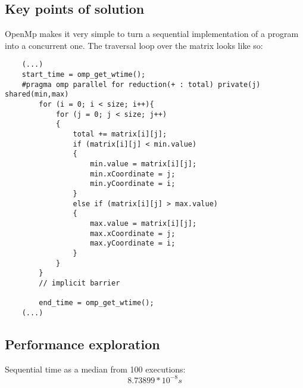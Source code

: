 \documentclass[a4paper,11pt]{article}
\begin{document}
\subsection*{Key points of solution}
OpenMp makes it very simple to turn a sequential implementation of a program into a concurrent one. The traversal loop over the matrix looks like so:

\begin{verbatim}
    (...)
    start_time = omp_get_wtime();
    #pragma omp parallel for reduction(+ : total) private(j) shared(min,max)
        for (i = 0; i < size; i++){
            for (j = 0; j < size; j++)
            {
                total += matrix[i][j];
                if (matrix[i][j] < min.value)
                {
                    min.value = matrix[i][j];
                    min.xCoordinate = j;
                    min.yCoordinate = i;
                }
                else if (matrix[i][j] > max.value)
                {
                    max.value = matrix[i][j];
                    max.xCoordinate = j;
                    max.yCoordinate = i;
                }
            }
        }
        // implicit barrier

        end_time = omp_get_wtime();
    (...)
\end{verbatim}

\subsection*{Performance exploration}

Sequential time as a median from 100 executions: \[ 8.73899 * 10^{-8}s\]
\end{document}

